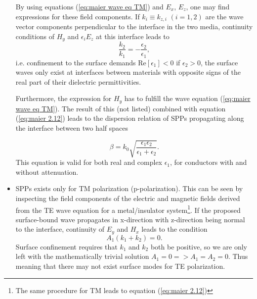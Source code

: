 \begin{itemize}
    By using equations (\ref{eq:maier wave eq TM}) and $E_x$, $E_z$, one may find expressions for these field components.  If $k_i \equiv k_{z,i}$ $(i=1,2)$ are the wave vector components perpendicular to the interface in the two media, continuity conditions of $H_y$ and $\epsilon_i E_z$ at this interface leads to \cite{maier}
    \begin{equation}
        \label{eq:maier 2.12}
        \frac{k_2}{k_1} = -\frac{\epsilon_2}{\epsilon_1},
    \end{equation}
    i.e. confinement to the surface demands Re$[\epsilon_1]<0$ if $\epsilon_2>0$, the surface waves only exist at interfaces between materials with opposite signs of the real part of their dielectric permittivities.
    
    Furthermore, the expression for $H_y$ has to fulfill the wave equation (\ref{eq:maier wave eq TM}). The result of this (not listed) combined with equation (\ref{eq:maier 2.12}) leads to the dispersion relation of SPPs propagating along the interface between two half spaces
    
    \begin{equation}
        \beta = k_0 \sqrt{\frac{\epsilon_1\epsilon_2}{\epsilon_1+\epsilon_2}}.
    \end{equation}
    This equation is valid for both real and complex $\epsilon_1$, for conductors with and without attenuation.
    
    \item SPPs exists only for TM polarization (p-polarization). This can be seen by inspecting the field components of the electric and magnetic fields derived from the TE wave equation for a metal/insulator system\footnote{The same procedure for TM leads to equation (\ref{eq:maier 2.12})}. If the proposed surface-bound wave propagates in x-direction with z-direction being normal to the interface, continuity of $E_y$ and $H_x$ leads to the condition
    \begin{equation}
        A_1(k_1+k_2)=0.
    \end{equation}
    Surface confinement requires that $k_1$ and $k_2$ both be positive, so we are only left with the mathematically trivial solution $A_1 = 0 => A_1 = A_2 = 0$. Thus meaning that there may not exist surface modes for TE polarization\cite{maier}.
    

\end{itemize}
